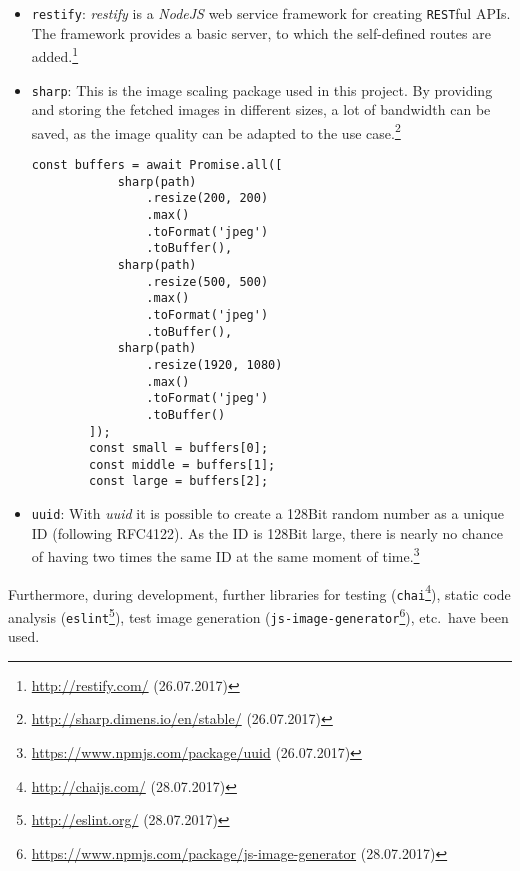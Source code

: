 \begin{itemize}
	\item \texttt{restify}: \textit{restify} is a \textit{NodeJS} web service framework for creating \texttt{REST}ful APIs. The framework provides a basic server, to which the self-defined routes are added.\footnote{\url{http://restify.com/} (26.07.2017)}
	\item \texttt{sharp}: This is the image scaling package used in this project. By providing and storing the fetched images in different sizes, a lot of bandwidth can be saved, as the image quality can be adapted to the use case.\footnote{\url{http://sharp.dimens.io/en/stable/} (26.07.2017)}
	\begin{lstlisting}[caption={In the above example from the backend an extract from the 'upload' method for images is shown. The image is scaled to three different sizes and those are then lateron stored in the S3 storage.}, label=lst:sharp]
		const buffers = await Promise.all([
			sharp(path)
				.resize(200, 200)
				.max()
				.toFormat('jpeg')
				.toBuffer(),
			sharp(path)
				.resize(500, 500)
				.max()
				.toFormat('jpeg')
				.toBuffer(),
			sharp(path)
				.resize(1920, 1080)
				.max()
				.toFormat('jpeg')
				.toBuffer()
		]);
		const small = buffers[0];
		const middle = buffers[1];
		const large = buffers[2];
	\end{lstlisting}
	\item \texttt{uuid}: With \textit{uuid} it is possible to create a 128Bit random number as a unique ID (following RFC4122). As the ID is 128Bit large, there is nearly no chance of having two times the same ID at the same moment of time.\footnote{\url{https://www.npmjs.com/package/uuid} (26.07.2017)}
\end{itemize}
Furthermore, during development, further libraries for testing (\texttt{chai}\footnote{\url{http://chaijs.com/} (28.07.2017)}), static code analysis (\texttt{eslint}\footnote{\url{http://eslint.org/} (28.07.2017)}), test image generation (\texttt{js-image-generator}\footnote{\url{https://www.npmjs.com/package/js-image-generator} (28.07.2017)}), etc.\ have been used.
